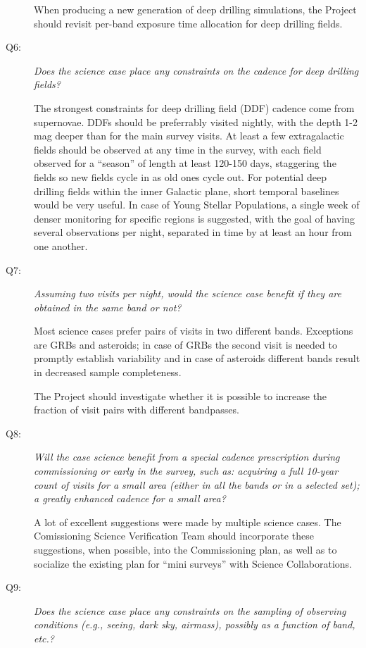 \begin{description}
When producing a new generation of deep drilling simulations, the
Project should revisit per-band exposure time allocation for deep
drilling fields.


\item[Q6:] {\it Does the science case place any constraints on the
cadence for deep drilling fields?}

The strongest constraints for deep drilling field (DDF) cadence come
from supernovae. DDFs should be preferrably visited nightly, with the
depth 1-2 mag deeper than for the main survey visits. At least a few
extragalactic fields should be observed at any time in the survey, with
each field observed for a ``season'' of length at least 120-150 days,
staggering the fields so new fields cycle in as old ones cycle out. For
potential deep drilling fields within the inner Galactic plane, short
temporal baselines would be very useful. In case of Young Stellar
Populations, a single week of denser monitoring for specific regions is
suggested, with the goal of having several observations per night,
separated in time by at least an hour from one another.


\item[Q7:] {\it Assuming two visits per night, would the science case
benefit if they are obtained in the same band or not?}

Most science cases prefer pairs of visits in two different bands.
Exceptions are GRBs and asteroids; in case of GRBs the second visit is
needed to promptly establish variability and in case of asteroids
different bands result in decreased sample completeness.

The Project should investigate whether it is possible to increase the
fraction of visit pairs with different bandpasses.


\item[Q8:] {\it Will the case science benefit from a special cadence
prescription during commissioning or early in the survey, such as:
acquiring a full 10-year count of visits for a small area (either in all
the bands or in a  selected set); a greatly enhanced cadence for a small
area?}

A lot of excellent suggestions were made by multiple science cases.
The Comissioning Science Verification Team should incorporate these
suggestions, when possible, into the Commissioning plan, as well
as to socialize the existing plan for ``mini surveys'' with Science
Collaborations.


\item[Q9:] {\it Does the science case place any constraints on the
sampling of observing conditions (e.g., seeing, dark sky, airmass),
possibly as a function of band, etc.?}


\end{description}
